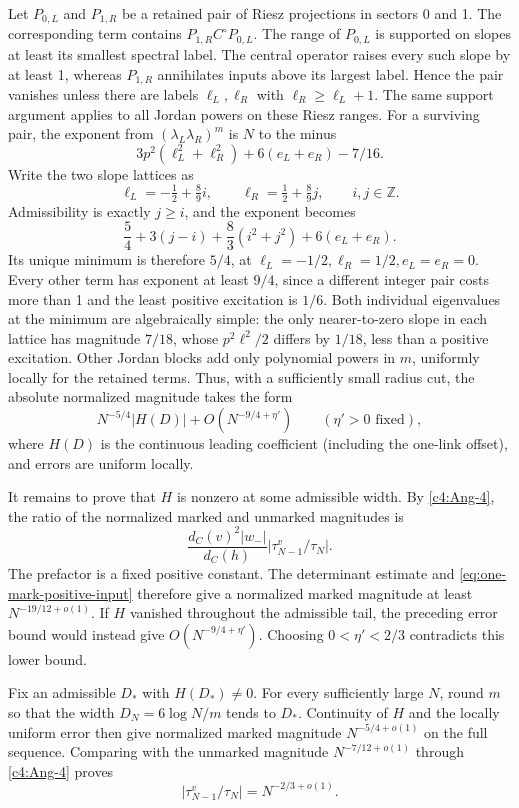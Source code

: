 Let \(P_{0,L}\) and \(P_{1,R}\) be a retained pair of Riesz projections
in sectors 0 and 1. The corresponding term contains
\(P_{1,R}C^\circ P_{0,L}\). The range of \(P_{0,L}\) is supported on
slopes at least its smallest spectral label. The central operator
raises every such slope by at least 1, whereas \(P_{1,R}\) annihilates
inputs above its largest label. Hence the pair vanishes unless there
are labels \(\ell_L,\ell_R\) with \(\ell_R\ge\ell_L+1\). The same
support argument applies to all Jordan powers on these Riesz ranges.
For a surviving pair, the exponent from
\((\lambda_L\lambda_R)^m\) is \(N\) to the minus
\[
 3p^2(\ell_L^2+\ell_R^2)+6(e_L+e_R)-7/16 .
\]
Write the two slope lattices as
\[
 \ell_L=-\tfrac12+\tfrac89 i,\qquad
 \ell_R=\tfrac12+\tfrac89 j,\qquad i,j\in\mathbb Z.
\]
Admissibility is exactly \(j\ge i\), and the exponent becomes
\[
 \frac54+3(j-i)+\frac83(i^2+j^2)+6(e_L+e_R).
\]
Its unique minimum is therefore \(5/4\), at
\(\ell_L=-1/2,\ell_R=1/2,e_L=e_R=0\). Every other term has exponent
at least \(9/4\), since a different integer pair costs more than 1
and the least positive excitation is \(1/6\). Both individual
eigenvalues at the minimum are algebraically simple: the only
nearer-to-zero slope in each lattice has magnitude \(7/18\), whose
\(p^2\ell^2/2\) differs by \(1/18\), less than a positive excitation.
Other Jordan blocks add only polynomial powers in \(m\), uniformly
locally for the retained terms. Thus, with a sufficiently small radius
cut, the absolute normalized magnitude takes the form
\[
 N^{-5/4}|H(D)|+O(N^{-9/4+\eta'})\qquad(\eta'>0\text{ fixed}),
\]
where \(H(D)\) is the continuous leading coefficient (including the one-link offset), and errors are uniform locally.

It remains to prove that \(H\) is nonzero at some admissible width.
By \eqref{c4:Ang-4}, the ratio of the normalized marked and unmarked
magnitudes is
\[
 \frac{d_C(v)^2|w_-|}{d_C(h)}
                  \big|\tau^v_{N-1}/\tau_N\big|.
\]
The prefactor is a fixed positive constant. The determinant estimate
and \eqref{eq:one-mark-positive-input} therefore give a normalized
marked magnitude at least \(N^{-19/12+o(1)}\). If \(H\) vanished
throughout the admissible tail, the preceding error bound would instead
give \(O(N^{-9/4+\eta'})\). Choosing \(0<\eta'<2/3\) contradicts this
lower bound.

Fix an admissible \(D_*\) with \(H(D_*)\ne0\). For every sufficiently
large \(N\), round \(m\) so that the width
\(D_N=6\log N/m\) tends to \(D_*\). Continuity of \(H\) and the locally
uniform error then give normalized marked magnitude
\(N^{-5/4+o(1)}\) on the full sequence. Comparing with the unmarked
magnitude \(N^{-7/12+o(1)}\) through \eqref{c4:Ang-4} proves
\[
 \big|\tau^v_{N-1}/\tau_N\big|=N^{-2/3+o(1)} .
\]

